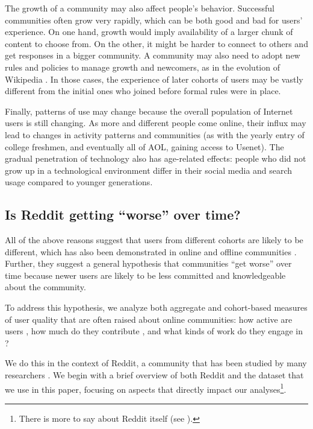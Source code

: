 \documentclass[10pt, oneside, onecolumn]{article}
\begin{document}
The growth of a community may also affect people's behavior. Successful communities often grow very rapidly, which can be both good and bad for users' experience. On one hand, growth would imply availability of a larger chunk of content to choose from. On the other, it might be harder to connect to others and get responses in a bigger community. A community may also need to adopt new rules and policies to manage growth and newcomers, as in the evolution of Wikipedia \cite{Choi2010,Bryant2005}. In those cases, the experience of later cohorts of users may be vastly different from the initial ones who joined before formal rules were in place. 

Finally, patterns of use may change because the overall population of Internet users is still changing.  As more and different people come online, their influx may lead to changes in activity patterns and communities (as with the yearly entry of college freshmen, and eventually all of AOL, gaining access to Usenet).  The gradual penetration of technology also has age-related effects:  people who did not grow up in a technological environment differ in their social media and search usage compared to younger generations\cite{Correa2010,Beldona2005}. 

\subsection{Is Reddit getting ``worse'' over time?}
All of the above reasons suggest that users from different cohorts are likely to be different, which has also been demonstrated in online and offline communities \cite{Ryder1965,Danescu-niculescu-mizil2013,Prensky2001,Correa2010}.  Further, they suggest a general hypothesis that communities ``get worse'' over time because newer users are likely to be less committed and knowledgeable about the community. 

To address this hypothesis, we analyze both aggregate and cohort-based measures of user quality that are often raised about online communities: how active are users \cite{Scellato2011,Hughes2009,Java2007,Levy1984}, how much do they contribute \cite{Scellato2011,Gruhl2004,Guo2009}, and what kinds of work do they engage in \cite{Welser2011,Choi2010,Panciera2009}?  

We do this in the context of Reddit, a community that has been studied by many researchers \cite{Gilbert2013,Stoddard2015,Bergstrom2011,Tan2015}. We begin with a brief overview of both Reddit and the dataset that we use in this paper, focusing on aspects that directly impact our analyses\footnote{There is more to say about Reddit itself (see \cite{AboutReddit}).}.
\end{document}
